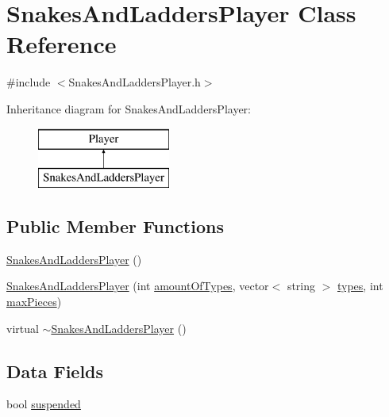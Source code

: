 \hypertarget{classSnakesAndLaddersPlayer}{\section{Snakes\-And\-Ladders\-Player Class Reference}
\label{classSnakesAndLaddersPlayer}
}


{\ttfamily \#include $<$Snakes\-And\-Ladders\-Player.\-h$>$}

Inheritance diagram for Snakes\-And\-Ladders\-Player\-:\begin{figure}[H]
\begin{center}
\leavevmode
\includegraphics[height=2.000000cm]{classSnakesAndLaddersPlayer}
\end{center}
\end{figure}
\subsection*{Public Member Functions}
\begin{DoxyCompactItemize}
\item 
\hyperlink{classSnakesAndLaddersPlayer_a51b2c254a10ea464cb77915f207995ff}{Snakes\-And\-Ladders\-Player} ()
\item 
\hyperlink{classSnakesAndLaddersPlayer_ae5521be65275b2bc9bc820d757a49c98}{Snakes\-And\-Ladders\-Player} (int \hyperlink{classPlayer_a677f323efe4a7534a054345a4d99d40f}{amount\-Of\-Types}, vector$<$ string $>$ \hyperlink{classPlayer_a05f23ead572f763fedd4488d6a82b822}{types}, int \hyperlink{classPlayer_a69e6c3b3ae77235f6f47c49b09e67331}{max\-Pieces})
\item 
virtual \hyperlink{classSnakesAndLaddersPlayer_a2bdf690e712e815c9a77977a75c4d271}{$\sim$\-Snakes\-And\-Ladders\-Player} ()
\end{DoxyCompactItemize}
\subsection*{Data Fields}
\begin{DoxyCompactItemize}
\item 
bool \hyperlink{classSnakesAndLaddersPlayer_ab6a5f4ff79540545a4f81164cd70e021}{suspended}
\end{DoxyCompactItemize}
